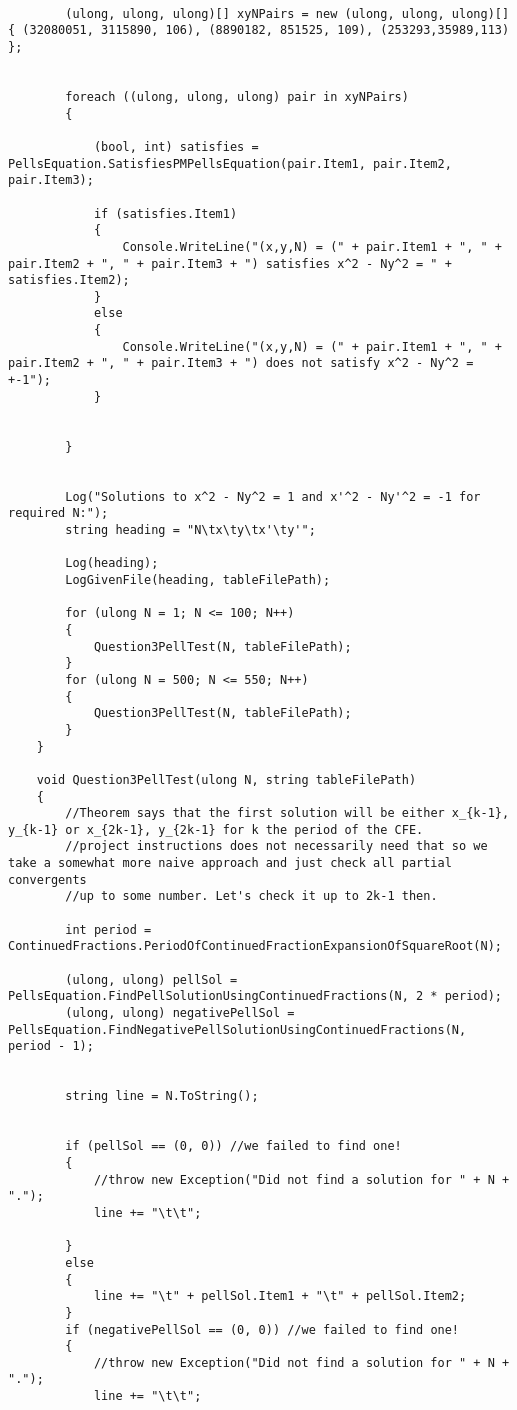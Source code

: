 \documentclass{article}
\begin{document}
\begin{lstlisting}
		
		(ulong, ulong, ulong)[] xyNPairs = new (ulong, ulong, ulong)[] { (32080051, 3115890, 106), (8890182, 851525, 109), (253293,35989,113) };
		
		
		foreach ((ulong, ulong, ulong) pair in xyNPairs)
		{
			
			(bool, int) satisfies = PellsEquation.SatisfiesPMPellsEquation(pair.Item1, pair.Item2, pair.Item3);
			
			if (satisfies.Item1)
			{
				Console.WriteLine("(x,y,N) = (" + pair.Item1 + ", " + pair.Item2 + ", " + pair.Item3 + ") satisfies x^2 - Ny^2 = " + satisfies.Item2);
			}
			else
			{
				Console.WriteLine("(x,y,N) = (" + pair.Item1 + ", " + pair.Item2 + ", " + pair.Item3 + ") does not satisfy x^2 - Ny^2 = +-1");
			}
			
			
		}
		
		
		Log("Solutions to x^2 - Ny^2 = 1 and x'^2 - Ny'^2 = -1 for required N:");
		string heading = "N\tx\ty\tx'\ty'";
		
		Log(heading);
		LogGivenFile(heading, tableFilePath);
		
		for (ulong N = 1; N <= 100; N++)
		{
			Question3PellTest(N, tableFilePath);
		}
		for (ulong N = 500; N <= 550; N++)
		{
			Question3PellTest(N, tableFilePath);
		}
	}
	
	void Question3PellTest(ulong N, string tableFilePath)
	{
		//Theorem says that the first solution will be either x_{k-1}, y_{k-1} or x_{2k-1}, y_{2k-1} for k the period of the CFE.
		//project instructions does not necessarily need that so we take a somewhat more naive approach and just check all partial convergents
		//up to some number. Let's check it up to 2k-1 then.
		
		int period = ContinuedFractions.PeriodOfContinuedFractionExpansionOfSquareRoot(N);
		
		(ulong, ulong) pellSol = PellsEquation.FindPellSolutionUsingContinuedFractions(N, 2 * period);
		(ulong, ulong) negativePellSol = PellsEquation.FindNegativePellSolutionUsingContinuedFractions(N, period - 1);
		
		
		string line = N.ToString();
		
		
		if (pellSol == (0, 0)) //we failed to find one!
		{
			//throw new Exception("Did not find a solution for " + N + ".");
			line += "\t\t";
			
		}
		else
		{
			line += "\t" + pellSol.Item1 + "\t" + pellSol.Item2;
		}
		if (negativePellSol == (0, 0)) //we failed to find one!
		{
			//throw new Exception("Did not find a solution for " + N + ".");
			line += "\t\t";
			

\end{lstlisting}
\end{document}
